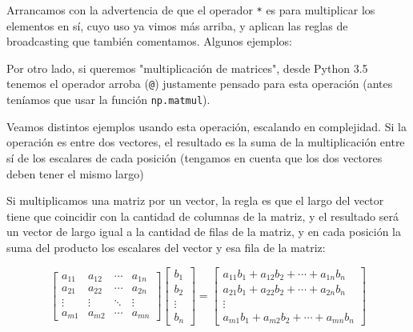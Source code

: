 Arrancamos con la advertencia de que el operador \verb|*| es para multiplicar los elementos en sí, cuyo uso ya vimos más arriba, y aplican las reglas de broadcasting que también comentamos. Algunos ejemplos:


Por otro lado, si queremos "multiplicación de matrices", desde Python 3.5 tenemos el operador arroba (\verb|@|) justamente pensado para esta operación (antes teníamos que usar la función \texttt{np.matmul}).

Veamos distintos ejemplos usando esta operación, escalando en complejidad.  Si la operación es entre dos vectores, el resultado es la suma de la multiplicación entre sí de los escalares de cada posición (tengamos en cuenta que los dos vectores deben tener el mismo largo)


Si multiplicamos una matriz por un vector, la regla es que el largo del vector tiene que coincidir con la cantidad de columnas de la matriz, y el resultado será un vector de largo igual a la cantidad de filas de la matriz, y en cada posición la suma del producto los escalares del vector y esa fila de la matriz:

\begin{equation*}
    \begin{bmatrix}
        a_{11} & a_{12} & \cdots & a_{1n}  \\
        a_{21} & a_{22} & \cdots & a_{2n}  \\
        \vdots & \vdots & \ddots & \vdots  \\
        a_{m1} & a_{m2} & \cdots & a_{mn}   
    \end{bmatrix}
    \begin{bmatrix}
        b_1 \\
        b_2 \\
        \vdots \\
        b_n
    \end{bmatrix} 
    =
    \begin{bmatrix}
        a_{11} b_1 + a_{12} b_2 + \cdots + a_{1n} b_n  \\
        a_{21} b_1 + a_{22} b_2 + \cdots + a_{2n} b_n  \\
        \vdots \\
        a_{m1} b_1 + a_{m2} b_2 + \cdots + a_{mn} b_n 
    \end{bmatrix}
\end{equation*} 

